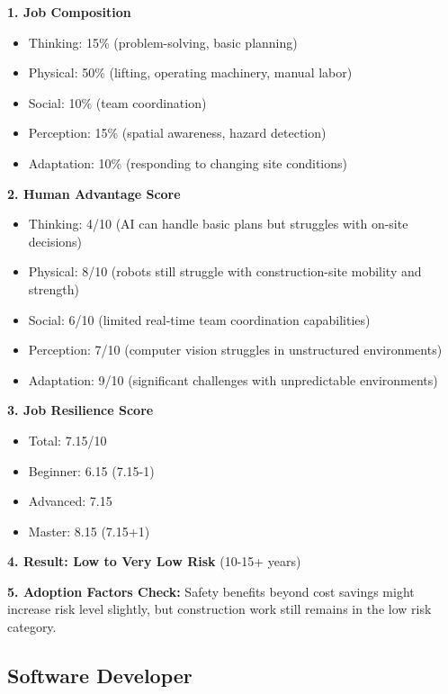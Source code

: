 \documentclass[
  11pt,
]{article}
\providecommand{\tightlist}{%
  \setlength{\itemsep}{0pt}\setlength{\parskip}{0pt}}
\begin{document}
\textbf{1. Job Composition}

\begin{itemize}
\tightlist
\item
  Thinking: 15\% (problem-solving, basic planning)
\item
  Physical: 50\% (lifting, operating machinery, manual labor)
\item
  Social: 10\% (team coordination)
\item
  Perception: 15\% (spatial awareness, hazard detection)
\item
  Adaptation: 10\% (responding to changing site conditions)
\end{itemize}

\textbf{2. Human Advantage Score}

\begin{itemize}
\tightlist
\item
  Thinking: 4/10 (AI can handle basic plans but struggles with on-site
  decisions)
\item
  Physical: 8/10 (robots still struggle with construction-site mobility
  and strength)
\item
  Social: 6/10 (limited real-time team coordination capabilities)
\item
  Perception: 7/10 (computer vision struggles in unstructured
  environments)
\item
  Adaptation: 9/10 (significant challenges with unpredictable
  environments)
\end{itemize}

\textbf{3. Job Resilience Score}

\begin{itemize}
\tightlist
\item
  Total: 7.15/10
\item
  Beginner: 6.15 (7.15-1)
\item
  Advanced: 7.15
\item
  Master: 8.15 (7.15+1)
\end{itemize}

\textbf{4. Result: Low to Very Low Risk} (10-15+ years)

\textbf{5. Adoption Factors Check:} Safety benefits beyond cost savings
might increase risk level slightly, but construction work still remains
in the low risk category.

\subsection{Software Developer}\label{software-developer}
\end{document}
